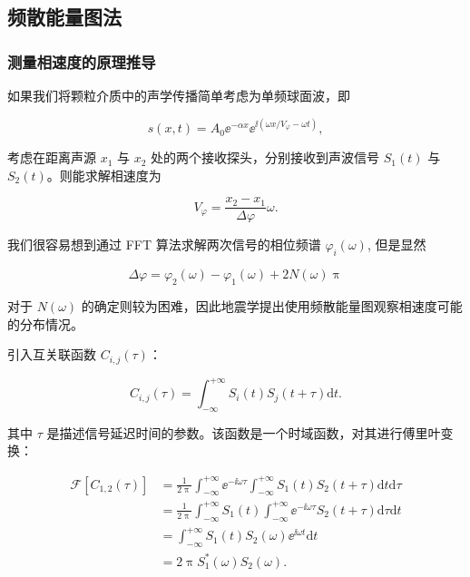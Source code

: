 
\subsection{频散能量图法}

\subsubsection{测量相速度的原理推导}

如果我们将颗粒介质中的声学传播简单考虑为单频球面波，即

\begin{equation}
  s(x,t) = A_{0}{\ee}^{-\alpha x}{\ee}^{\ii(\omega x/V_{\varphi}-\omega t)},
  \label{eq:spherical_wave}
\end{equation}

考虑在距离声源 $x_{1}$ 与 $x_{2}$ 处的两个接收探头，分别接收到声波信号 $S_{1}(t)$ 与 $S_{2}(t)$。则能求解相速度为

\begin{equation}
  V_{\varphi} = \frac{x_{2}-x_{1}}{\Delta \varphi}\omega.
\end{equation}

我们很容易想到通过 FFT 算法求解两次信号的相位频谱 $\varphi_{i}(\omega)$, 但是显然

\begin{equation}
  \Delta \varphi = \varphi_{2}(\omega) - \varphi_{1}(\omega) + 2N(\omega)\uppi
\end{equation}

对于 $N(\omega)$ 的确定则较为困难，因此地震学提出使用频散能量图观察相速度可能的分布情况。

引入互关联函数 $C_{i,j}(\tau)$：

\begin{equation}
  C_{i,j}(\tau) = \int_{-\infty}^{+\infty}S_{i}(t)S_{j}(t+\tau)\mathrm{d}t.
\end{equation}

其中 $\tau$ 是描述信号延迟时间的参数。该函数是一个时域函数，对其进行傅里叶变换：

\begin{align}
  \mathcal{F}[C_{1,2}(\tau)] &= \frac{1}{2\uppi}\int_{-\infty}^{+\infty}{\ee}^{-\ii\omega\tau}\int_{-\infty}^{+\infty}S_{1}(t)S_{2}(t+\tau)\mathrm{d}t\mathrm{d}\tau \nonumber \\
  &= \frac{1}{2\uppi}\int_{-\infty}^{+\infty}S_{1}(t)\int_{-\infty}^{+\infty}{\ee}^{-\ii\omega\tau}S_{2}(t+\tau)\mathrm{d}\tau\mathrm{d}t \nonumber \\
  &= \int_{-\infty}^{+\infty}S_{1}(t)S_{2}(\omega){\ee}^{\ii\omega t}\mathrm{d}t \nonumber \\
  &= 2\uppi S_{1}^{*}(\omega)S_{2}(\omega).
\end{align}

